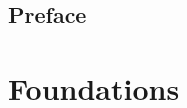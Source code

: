 \documentclass{book}
\begin{document}
\frontmatter
\chapter{Preface}
\mainmatter
\part{Foundations}
\end{document}

